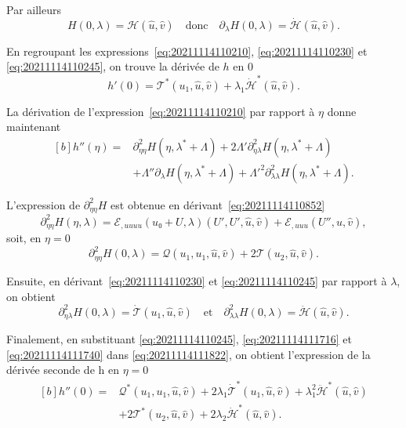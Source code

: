\documentclass[12pt, final]{amsart}
\begin{document}
Par ailleurs
\begin{equation}
  \label{eq:20211114110245}
  H(0, \lambda)=\mathcal H(\hat{u}, \hat{v})
  \quad\text{donc}\quad
  \partial_\lambda H(0, \lambda)=\dot{\mathcal H}(\hat{u}, \hat{v}).
\end{equation}

En regroupant les expressions~\eqref{eq:20211114110210},
\eqref{eq:20211114110230} et \eqref{eq:20211114110245}, on trouve la dérivée de
\(h\) en 0
\begin{equation}
  h'(0)=\mathcal T^\ast(u_1, \hat{u}, \hat{v})
  +\lambda_1\dot{\mathcal H}^\ast(\hat{u}, \hat{v}).
\end{equation}

La dérivation de l'expression~\eqref{eq:20211114110210} par rapport à \(η\)
donne maintenant
\begin{equation}
  \label{eq:20211114111822}
  \begin{aligned}[b]
    h''(η)={}&\partial_{ηη}^2 H(η, \lambda^\ast+\Lambda)
    +2\Lambda'\partial_{η\lambda}^2 H(η, \lambda^\ast+\Lambda)\\
    &+\Lambda''\partial_{\lambda}H(η, \lambda^\ast+\Lambda)
    +\Lambda'^2\partial_{\lambda\lambda}^2H(η, \lambda^\ast+\Lambda).
  \end{aligned}
\end{equation}

L'expression de \(\partial_{ηη}^2H\) est obtenue en
dérivant~\eqref{eq:20211114110852}
\begin{equation}
  \partial_{ηη}^2H(η, \lambda)
  =ℰ_{,uuuu}(u₀+U, \lambda)(U', U', \hat{u}, \hat{v})
  +ℰ_{,uuu}(U'', \hat{u}, \hat{v}),
\end{equation}
soit, en \(η=0\)
\begin{equation}
  \label{eq:20211114111716}
  \partial_{ηη}^2H(0, \lambda)=\mathcal Q(u_1, u_1, \hat{u}, \hat{v})
  +2\mathcal T(u_2, \hat{u}, \hat{v}).
\end{equation}

Ensuite, en dérivant~\eqref{eq:20211114110230} et \eqref{eq:20211114110245} par
rapport à \(\lambda\), on obtient
\begin{equation}
  \label{eq:20211114111740}
  \partial_{η\lambda}^2H(0, \lambda)=\dot{\mathcal T}(u_1, \hat{u}, \hat{v})
  \quad\text{et}\quad
  \partial_{\lambda\lambda}^2H(0, \lambda)=\ddot{\mathcal H}(\hat{u}, \hat{v}).
\end{equation}

Finalement, en substituant \eqref{eq:20211114110245}, \eqref{eq:20211114111716}
et \eqref{eq:20211114111740} dans \eqref{eq:20211114111822}, on obtient
l'expression de la dérivée seconde de h en \(η=0\)
\begin{equation}
  \begin{aligned}[b]
    h''(0)={}&\mathcal Q^\ast(u_1, u_1, \hat{u}, \hat{v})
    +2\lambda_1\dot{\mathcal T}^\ast(u_1, \hat{u}, \hat{v})
    +\lambda_1^2\ddot{\mathcal H}^\ast(\hat{u}, \hat{v})\\
    &+2\mathcal T^\ast(u_2, \hat{u}, \hat{v})
    +2\lambda_2\dot{\mathcal H}^\ast(\hat{u}, \hat{v}).
  \end{aligned}
\end{equation}
\end{document}
